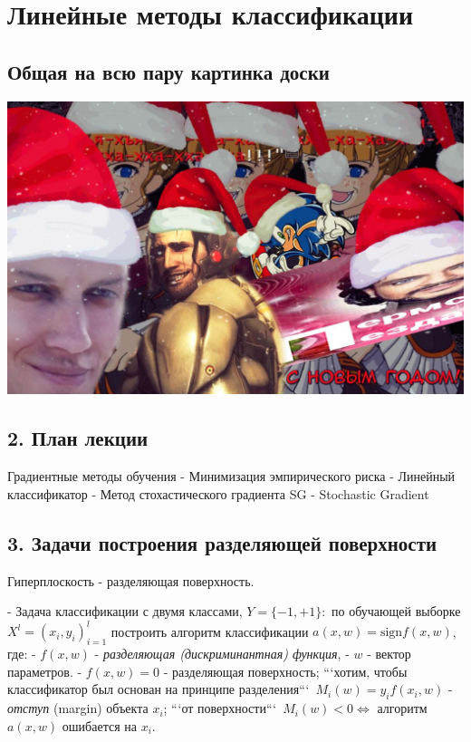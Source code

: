 \section{Линейные методы классификации}

\subsection{Общая на всю пару картинка доски}

\includegraphics[scale=0.3]{figures/samplefigure.jpg}

\subsection{2. План лекции}

Градиентные методы обучения
- Минимизация эмпирического риска
- Линейный классификатор
- Метод стохастического градиента SG - Stochastic Gradient

\subsection{3. Задачи построения разделяющей поверхности}

Гиперплоскость - разделяющая поверхность.

- Задача классификации с двумя классами, $Y = {\lbrace -1, +1 \rbrace}$:\
по обучающей выборке $X^l = {\left( x_i, y_i \right)}^l_{i=1}$ построить
алгоритм классификации
$a{\left( x, w \right)} = \text{sign}{f{\left( x, w \right)}}$, где:
    - $f{\left( x, w \right)}$ - \textit{разделяющая (дискриминантная) функция},
    - $w$ - вектор параметров.
- $f{\left( x, w \right)} = 0$ - разделяющая поверхность;
```хотим, чтобы классификатор был основан на принципе разделения```\
$M_i{\left( w \right)} = y_i f{\left( x_i, w \right)}$ - \textit{отступ} (margin)
объекта $x_i$; ```от поверхности```\
$M_i{\left( w \right)} < 0 \iff$ алгоритм
$a{\left( x, w \right)}$ ошибается на $x_i$.

